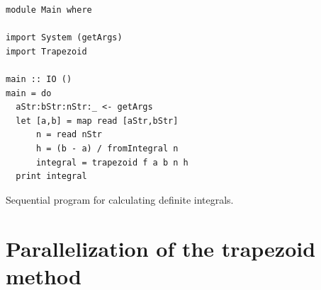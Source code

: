 \documentclass{tmr}
\begin{document}
\begin{listing}
\begin{Verbatim}
module Main where

import System (getArgs)
import Trapezoid

main :: IO ()
main = do
  aStr:bStr:nStr:_ <- getArgs
  let [a,b] = map read [aStr,bStr]
      n = read nStr
      h = (b - a) / fromIntegral n
      integral = trapezoid f a b n h
  print integral 
\end{Verbatim}
\caption{Sequential program for calculating definite integrals. \label{single-threaded}}
\end{listing}


%



\section{Parallelization of the trapezoid method}
\end{document}
